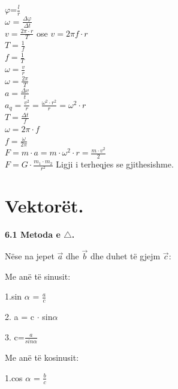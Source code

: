 \documentclass[twocolumn]{article}
\begin{document}
	$\varphi$=$\frac{l}{r}$\\
	
	$\omega$ = $\frac{\Delta \varphi}{\Delta t}$\\
	
	$v=\frac{2 \pi \cdot r}{T}$ ose $v=2 \pi f \cdot r$\\
	
	$T=\frac{1}{f}$\\
	
	$f=\frac{1}{T}$\\
	
	$\omega = \frac{v}{r}$\\
	
	$\omega = \frac{2 \pi}{T}$\\
	
	$a=\frac{\Delta v}{t}$\\
	
	$a_q=\frac{v^2}{r}=\frac{\omega^2 \cdot r^2}{r}=\omega^2 \cdot r$\\
	
	$T=\frac{\Delta t}{f}$\\
	
	$\omega = 2\pi \cdot f$\\
	
	$f=\frac{\omega}{2 \pi}$\\
	
	$F=m \cdot a = m \cdot \omega^2 \cdot r = \frac{m \cdot v^2}{2}$\\
	
	
	$F= G \cdot \frac{m_1 \cdot m_2}{r^2} $ Ligji i terheqjes se gjithesishme.
	
	\section{Vektorët.}
	
	\textbf{6.1 Metoda e $\triangle$.}
	
	Nëse na jepet $\vec{a}$ dhe $\vec{b}$ dhe duhet të gjejm $\vec{c}$:
	\begin{center}
		Me anë të sinusit:
	\end{center}
	
	1.sin $\alpha$ = $\frac{a}{c}$
	
	2. a = c $\cdot$ sin$\alpha$
	
	3. c=$\frac{a}{sin \alpha}$
	\begin{center}
		Me anë të kosinusit:
	\end{center}
	
	1.cos $\alpha$ = $\frac{b}{c}$
	
\end{document}
